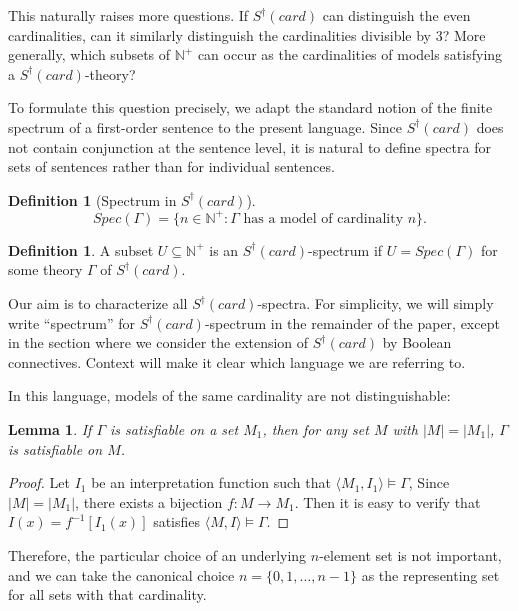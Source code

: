 \documentclass[12pt, reqno]{amsart}
\newtheorem{lemma}[theorem]{Lemma}
\theoremstyle{definition}
\newtheorem{definition}[theorem]{Definition}
\theoremstyle{remark}
\numberwithin{equation}{section}
\begin{document}
This naturally raises more questions. If $S^{\dagger}(card)$ can distinguish the even cardinalities, can it similarly distinguish the cardinalities divisible by $3$? More generally, which subsets of $\mathbb N^+$ can occur as the cardinalities of models satisfying a $S^{\dagger}(card)$-theory?

To formulate this question precisely, we adapt the standard notion of the finite spectrum of a first-order sentence to the present language. Since $S^{\dagger}(card)$ does not contain conjunction at the sentence level, it is natural to define spectra for sets of sentences rather than for individual sentences.

\begin{definition}[Spectrum in $S^{\dagger}(card)$]\label{spec_def}
\[
	Spec(\Gamma) = \{n \in \mathbb{N}^+ : \Gamma \text{ has a model of cardinality } n\}.
\]
\end{definition}

\begin{definition}
A subset $U \subseteq \mathbb{N}^+$ is an $S^{\dagger}(card)$-spectrum if $U = Spec(\Gamma)$ for some theory $\Gamma$ of $S^{\dagger}(card)$. 
\end{definition}

Our aim is to characterize all $S^{\dagger}(card)$-spectra. For simplicity, we will simply write ``spectrum'' for $S^{\dagger}(card)$-spectrum in the remainder of the paper, except in the section where we consider the extension of $S^{\dagger}(card)$ by Boolean connectives. Context will make it clear which language we are referring to.

In this language, models of the same cardinality are not distinguishable: 

\begin{lemma}\label{card_essence}
	If $\Gamma$ is satisfiable on a set $M_1$, then for any set $M$ with $|M| = |M_1|$, $\Gamma$ is satisfiable on $M$. 
\end{lemma}

\begin{proof}
	Let $I_1$ be an interpretation function such that $\langle M_1, I_1\rangle \models \Gamma$, Since $|M| = |M_1|$, there exists a bijection $f: M \to M_1$. Then it is easy to verify that $I(x) = f^{-1}[I_1(x)]$ satisfies $\langle M, I\rangle \models \Gamma$. 
\end{proof}

Therefore, the particular choice of an underlying $n$-element set is not important, and we can take the canonical choice $n = \{0, 1, \dots, n-1\}$ as the representing set for all sets with that cardinality.
\end{document}
